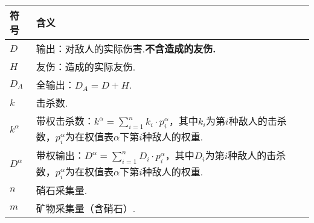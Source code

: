 \documentclass{ctexart}
\begin{document}
\begin{longtable}{|>{\centering\arraybackslash}p{3em}|>{\centering\arraybackslash}p{30em}|}
    \hline

    符号         & 含义                                                                                                                 \\

    \hline

    $D$        & 输出：对敌人的实际伤害\footnotemark.\textbf{不含造成的友伤.}                                                                         \\

    \hline

    $H$        & 友伤：造成的实际友伤.                                                                                                        \\

    \hline

    $D_A$      & 全输出：$D_A = D + H$.                                                                                                 \\

    \hline

    $k$        & 击杀数.                                                                                                               \\

    \hline

    $k^\alpha$ & 带权击杀数：$k^\alpha = \sum_{i = 1}^{n} k_i \cdot p^\alpha_i$，其中$k_i$为第$i$种敌人的击杀数，$p^\alpha_i$为在权值表$\alpha$下第$i$种敌人的权重. \\

    \hline

    $D^\alpha$ & 带权输出：$D^\alpha = \sum_{i = 1}^{n} D_i \cdot p^\alpha_i$，其中$D_i$为第$i$种敌人的击杀数，$p^\alpha_i$为在权值表$\alpha$下第$i$种敌人的权重.  \\

    \hline

    $n$        & 硝石采集量.                                                                                                             \\

    \hline

    $m$        & 矿物采集量（含硝石）.                                                                                                        \\


\end{longtable}
\end{document}
